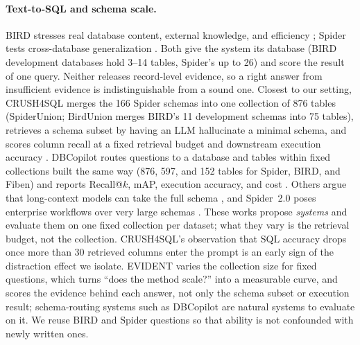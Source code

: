 \documentclass[11pt]{article}
\newcommand{\benchmark}{\mbox{EVIDENT}}  %
\begin{document}
\paragraph{Text-to-SQL and schema scale.} BIRD stresses real database content, external knowledge, and efficiency \citep{bird}; Spider tests cross-database generalization \citep{spider}. Both give the system its database (BIRD development databases hold 3--14 tables, Spider's up to 26) and score the result of one query. Neither releases record-level evidence, so a right answer from insufficient evidence is indistinguishable from a sound one. Closest to our setting, CRUSH4SQL merges the 166 Spider schemas into one collection of 876 tables (SpiderUnion; BirdUnion merges BIRD's 11 development schemas into 75 tables), retrieves a schema subset by having an LLM hallucinate a minimal schema, and scores column recall at a fixed retrieval budget and downstream execution accuracy \citep{crush4sql}. DBCopilot routes questions to a database and tables within fixed collections built the same way (876, 597, and 152 tables for Spider, BIRD, and Fiben) and reports Recall@$k$, mAP, execution accuracy, and cost \citep{dbcopilot}. Others argue that long-context models can take the full schema \citep{longctxsql}, and Spider~2.0 poses enterprise workflows over very large schemas \citep{spider2}. These works propose \emph{systems} and evaluate them on one fixed collection per dataset; what they vary is the retrieval budget, not the collection. CRUSH4SQL's observation that SQL accuracy drops once more than 30 retrieved columns enter the prompt is an early sign of the distraction effect we isolate. \benchmark{} varies the collection size for fixed questions, which turns ``does the method scale?'' into a measurable curve, and scores the evidence behind each answer, not only the schema subset or execution result; schema-routing systems such as DBCopilot are natural systems to evaluate on it. We reuse BIRD and Spider questions so that ability is not confounded with newly written ones.
\end{document}
